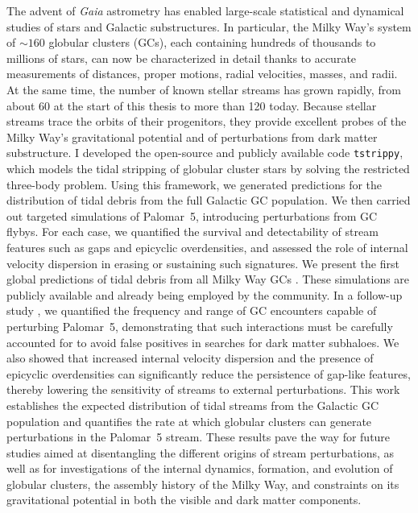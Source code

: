 The advent of \textit{Gaia} astrometry has enabled large-scale statistical and dynamical studies of stars and Galactic substructures. In particular, the Milky Way's system of $\sim 160$ globular clusters (GCs), each containing hundreds of thousands to millions of stars, can now be characterized in detail thanks to accurate measurements of distances, proper motions, radial velocities, masses, and radii. At the same time, the number of known stellar streams has grown rapidly, from about 60 at the start of this thesis to more than 120 today. Because stellar streams trace the orbits of their progenitors, they provide excellent probes of the Milky Way's gravitational potential and of perturbations from dark matter substructure. I developed the open-source and publicly available code \texttt{tstrippy}, which models the tidal stripping of globular cluster stars by solving the restricted three-body problem. Using this framework, we generated predictions for the distribution of tidal debris from the full Galactic GC population. We then carried out targeted simulations of Palomar~5, introducing perturbations from GC flybys. For each case, we quantified the survival and detectability of stream features such as gaps and epicyclic overdensities, and assessed the role of internal velocity dispersion in erasing or sustaining such signatures. We present the first global predictions of tidal debris from all Milky Way GCs \citep{2023A&A...673A..44F}. These simulations are publicly available and already being employed by the community. In a follow-up study \citep{2025A&A...699A.289F}, we quantified the frequency and range of GC encounters capable of perturbing Palomar~5, demonstrating that such interactions must be carefully accounted for to avoid false positives in searches for dark matter subhaloes. We also showed that increased internal velocity dispersion and the presence of epicyclic overdensities can significantly reduce the persistence of gap-like features, thereby lowering the sensitivity of streams to external perturbations. This work establishes the expected distribution of tidal streams from the Galactic GC population and quantifies the rate at which globular clusters can generate perturbations in the Palomar~5 stream. These results pave the way for future studies aimed at disentangling the different origins of stream perturbations, as well as for investigations of the internal dynamics, formation, and evolution of globular clusters, the assembly history of the Milky Way, and constraints on its gravitational potential in both the visible and dark matter components.



